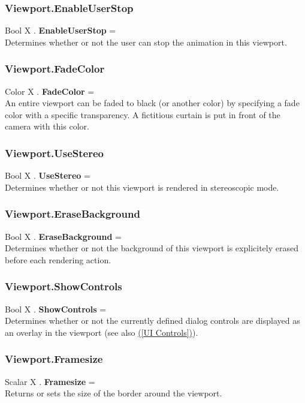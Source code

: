 \documentclass[10pt]{book}
\newcommand{\linkitem}[1]{\hyperref[#1]{\nameref{#1} (\ref{#1})}}
\begin{document}
\subsubsection{Viewport.EnableUserStop \label{F:Viewport:EnableUserStop}}
Bool X . \textbf{EnableUserStop} = \\
Determines whether or not the user can stop the animation in this viewport.

\subsubsection{Viewport.FadeColor \label{F:Viewport:FadeColor}}
Color X . \textbf{FadeColor} = \\
An entire viewport can be faded to black (or another color) by specifying a fade color with a specific transparency. A fictitious curtain is put in front of the camera with this color.

\subsubsection{Viewport.UseStereo \label{F:Viewport:UseStereo}}
Bool X . \textbf{UseStereo} = \\
Determines whether or not this viewport is rendered in stereoscopic mode.

\subsubsection{Viewport.EraseBackground \label{F:Viewport:EraseBackground}}
Bool X . \textbf{EraseBackground} = \\
Determines whether or not the background of this viewport is explicitely erased before each rendering action.

\subsubsection{Viewport.ShowControls \label{F:Viewport:ShowControls}}
Bool X . \textbf{ShowControls} = \\
Determines whether or not the currently defined dialog controls are displayed as an overlay in the viewport (see also \linkitem{UI Controls}).

\subsubsection{Viewport.Framesize \label{F:Viewport:Framesize}}
Scalar X . \textbf{Framesize} = \\
Returns or sets the size of the border around the viewport.
\end{document}
